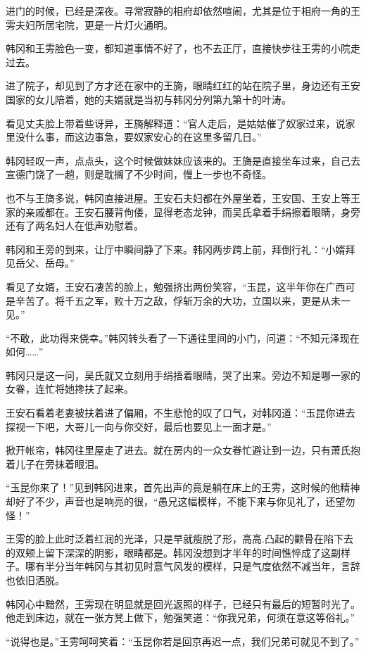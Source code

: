 进门的时候，已经是深夜。寻常寂静的相府却依然喧闹，尤其是位于相府一角的王雱夫妇所居宅院，更是一片灯火通明。

韩冈和王雱脸色一变，都知道事情不好了，也不去正厅，直接快步往王雱的小院走过去。

进了院子，却见到了方才还在家中的王旖，眼睛红红的站在院子里，身边还有王安国家的女儿陪着，她的夫婿就是当初与韩冈分列第九第十的叶涛。

看见丈夫脸上带着些讶异，王旖解释道：“官人走后，是姑姑催了奴家过来，说家里没什么事，而这边事急，要奴家安心的在这里多留几日。”

韩冈轻叹一声，点点头，这个时候做妹妹应该来的。王旖是直接坐车过来，自己去宣德门饶了一趟，则是耽搁了不少时间，慢上一步也不奇怪。

也不与王旖多说，韩冈直接进屋。王安石夫妇都在外屋坐着，王安国、王安上等王家的亲戚都在。王安石腰背佝偻，显得老态龙钟，而吴氏拿着手绢擦着眼睛，身旁还有了两名妇人在低声劝慰着。

韩冈和王旁的到来，让厅中瞬间静了下来。韩冈两步跨上前，拜倒行礼：“小婿拜见岳父、岳母。”

看见了女婿，王安石凄苦的脸上，勉强挤出两份笑容，“玉昆，这半年你在广西可是辛苦了。将千五之军，败十万之敌，俘斩万余的大功，立国以来，更是从未一见。”

“不敢，此功得来侥幸。”韩冈转头看了一下通往里间的小门，问道：“不知元泽现在如何……”

韩冈只是这一问，吴氏就又立刻用手绢捂着眼睛，哭了出来。旁边不知是哪一家的女眷，连忙将她搀扶了起来。

王安石看着老妻被扶着进了偏厢，不生悲怆的叹了口气，对韩冈道：“玉昆你进去探视一下吧，大哥儿一向与你交好，最后也要见上一面才是。”

掀开帐帘，韩冈往里屋走了进去。就在房内的一众女眷忙避让到一边，只有萧氏抱着儿子在旁抹着眼泪。

“玉昆你来了！”见到韩冈进来，首先出声的竟是躺在床上的王雱，这时候的他精神却好了不少，声音也是响亮的很，“愚兄这幅模样，不能下来与你见礼了，还望勿怪！”

王雱的脸上此时泛着红润的光泽，只是早就瘦脱了形，高高.凸起的颧骨在陷下去的双颊上留下深深的阴影，眼睛都是。韩冈没想到才半年的时间憔悴成了这副样子。哪有半分当年韩冈与其初见时意气风发的模样，只是气度依然不减当年，言辞也依旧洒脱。

韩冈心中黯然，王雱现在明显就是回光返照的样子，已经只有最后的短暂时光了。他走到床边，就在一张方凳上做下，勉强笑道：“你我兄弟，何须在意这等俗礼。”

“说得也是。”王雱呵呵笑着：“玉昆你若是回京再迟一点，我们兄弟可就见不到了。”

